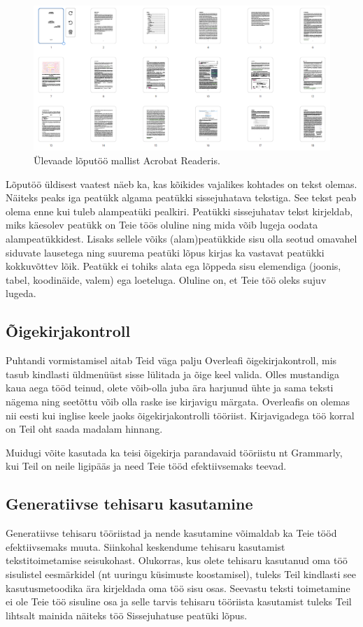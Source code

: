 \begin{figure}[t]
    \centering
    \includegraphics[width=\textwidth]{figures/Joonis6-AcrobatReaderKuva.png}
    \caption{Ülevaade lõputöö mallist Acrobat Readeris.}
    \label{fig:acrobatReaderÜlevaade}
\end{figure}
Lõputöö üldisest vaatest näeb ka, kas kõikides vajalikes kohtades on tekst olemas. Näiteks peaks iga peatükk algama peatükki sissejuhatava tekstiga. See tekst peab olema enne kui tuleb alampeatüki pealkiri. Peatükki sissejuhatav tekst kirjeldab, miks käesolev peatükk on Teie töös oluline ning mida võib lugeja oodata alampeatükkidest. Lisaks sellele võiks (alam)peatükkide sisu olla seotud omavahel siduvate lausetega ning suurema peatüki lõpus kirjas ka vastavat peatükki kokkuvõttev lõik. Peatükk ei tohiks alata ega lõppeda sisu elemendiga (joonis, tabel, koodinäide, valem) ega loeteluga. Oluline on, et Teie töö oleks sujuv lugeda.

\subsection{Õigekirjakontroll}
Puhtandi vormistamisel aitab Teid väga palju Overleafi õigekirjakontroll, mis tasub kindlasti üldmenüüst sisse lülitada ja õige keel valida. Olles mustandiga kaua aega tööd teinud, olete võib-olla juba ära harjunud ühte ja sama teksti nägema ning seetõttu võib olla raske ise kirjavigu märgata. Overleafis on olemas nii eesti kui inglise keele jaoks õigekirjakontrolli tööriist. Kirjavigadega töö korral on Teil oht saada madalam hinnang.

Muidugi võite kasutada ka teisi õigekirja parandavaid tööriistu nt Grammarly, kui Teil on neile ligipääs ja need Teie tööd efektiivsemaks teevad.

\subsection{Generatiivse tehisaru kasutamine}
Generatiivse tehisaru tööriistad ja nende kasutamine võimaldab ka Teie tööd efektiivsemaks muuta. Siinkohal keskendume tehisaru kasutamist tekstitoimetamise seisukohast. Olukorras, kus olete tehisaru kasutanud oma töö sisulistel eesmärkidel (nt uuringu küsimuste koostamisel), tuleks Teil kindlasti see kasutusmetoodika ära kirjeldada oma töö sisu osas. Seevastu teksti toimetamine ei ole Teie töö sisuline osa ja selle tarvis tehisaru tööriista kasutamist tuleks Teil lihtsalt mainida näiteks töö Sissejuhatuse peatüki lõpus.


